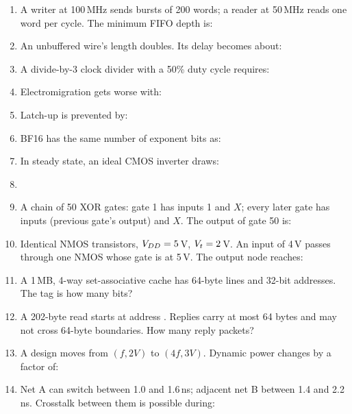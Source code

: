 \begin{enumerate}
  \item A writer at 100\,MHz sends bursts of 200 words; a reader at 50\,MHz reads one word per cycle. The minimum FIFO depth is:

  \item An unbuffered wire's length doubles. Its delay becomes about:

  \item A divide-by-3 clock divider with a 50\% duty cycle requires:

  \item Electromigration gets worse with:

  \item Latch-up is prevented by:

  \item BF16 has the same number of exponent bits as:

  \item In steady state, an ideal CMOS inverter draws:

  \item[\textbf{Challenge.}]\vspace{-0.5em}

  \item A chain of 50 XOR gates: gate 1 has inputs 1 and $X$; every later gate has inputs (previous gate's output) and $X$. The output of gate 50 is:

  \item Identical NMOS transistors, $V_{DD} = 5$\,V, $V_{t} = 2$\,V. An input of 4\,V passes through one NMOS whose gate is at 5\,V. The output node reaches:

  \item A 1\,MB, 4-way set-associative cache has 64-byte lines and 32-bit addresses. The tag is how many bits?

  \item A 202-byte read starts at address . Replies carry at most 64 bytes and may not cross 64-byte boundaries. How many reply packets?

  \item A design moves from $(f, 2V)$ to $(4f, 3V)$. Dynamic power changes by a factor of:

  \item Net A can switch between 1.0 and 1.6\,ns; adjacent net B between 1.4 and 2.2\,ns. Crosstalk between them is possible during:
\end{enumerate}

